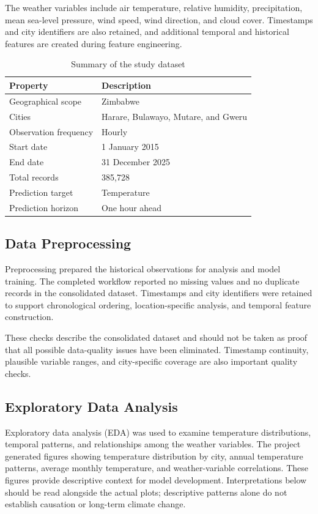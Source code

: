 \documentclass[12pt,a4paper]{article}
\begin{document}
	The weather variables include air temperature, relative humidity,
	precipitation, mean sea-level pressure, wind speed, wind direction,
	and cloud cover. Timestamps and city identifiers are also retained,
	and additional temporal and historical features are created during
	feature engineering.
	
	\begin{table}[H]
		\centering
		\caption{Summary of the study dataset}
		\label{tab:dataset-summary}
		\begin{tabular}{ll}
			\toprule
			\textbf{Property} & \textbf{Description}\\
			\midrule
			Geographical scope & Zimbabwe\\
			Cities & Harare, Bulawayo, Mutare, and Gweru\\
			Observation frequency & Hourly\\
			Start date & 1 January 2015\\
			End date & 31 December 2025\\
			Total records & 385,728\\
			Prediction target & Temperature\\
			Prediction horizon & One hour ahead\\
			\bottomrule
		\end{tabular}
	\end{table}
	
	\subsection{Data Preprocessing}
	
	Preprocessing prepared the historical observations for analysis and
	model training. The completed workflow reported no missing values
	and no duplicate records in the consolidated dataset. Timestamps
	and city identifiers were retained to support chronological ordering,
	location-specific analysis, and temporal feature construction.
	
	These checks describe the consolidated dataset and should not be
	taken as proof that all possible data-quality issues have been
	eliminated. Timestamp continuity, plausible variable ranges, and
	city-specific coverage are also important quality checks.
	
	\subsection{Exploratory Data Analysis}
	
	Exploratory data analysis (EDA) was used to examine temperature
	distributions, temporal patterns, and relationships among the
	weather variables. The project generated figures showing
	temperature distribution by city, annual temperature patterns,
	average monthly temperature, and weather-variable correlations.
	These figures provide descriptive context for model development.
	Interpretations below should be read alongside the actual plots;
	descriptive patterns alone do not establish causation or long-term
	climate change.
	
\end{document}
